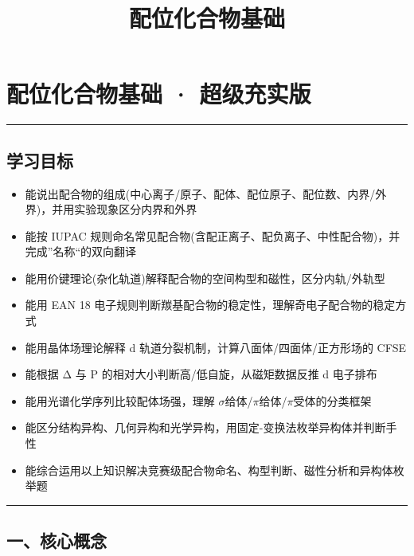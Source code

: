 \documentclass[a4paper,11pt]{ctexart}
\title{配位化合物基础}
\date{}
\providecommand{\tightlist}{\setlength{\itemsep}{0pt}\setlength{\parskip}{0pt}}
\newcommand{\箭}{\ensuremath{\rightarrow}}
\newcommand{\左箭}{\ensuremath{\leftarrow}}
\newcommand{\上箭}{\ensuremath{\uparrow}}
\newcommand{\下箭}{\ensuremath{\downarrow}}
\newcommand{\衡}{\ensuremath{\rightleftharpoons}}
\newcommand{\双箭}{\ensuremath{\leftrightarrow}}
\newcommand{\约等于}{\ensuremath{\approx}}
\newcommand{\小于等于}{\ensuremath{\leq}}
\newcommand{\大于等于}{\ensuremath{\geq}}
\newcommand{\不等于}{\ensuremath{\neq}}
\newcommand{\西格马}{\ensuremath{\sigma}}
\newcommand{\派}{\ensuremath{\pi}}
\begin{document}
\maketitle
\tableofcontents
\newpage
\section{配位化合物基础 · 超级充实版}\label{ux914dux4f4dux5316ux5408ux7269ux57faux7840-ux8d85ux7ea7ux5145ux5b9eux7248}

\begin{center}\rule{0.5\linewidth}{0.5pt}\end{center}

\subsection{学习目标}\label{ux5b66ux4e60ux76eeux6807}

\begin{itemize}
\tightlist
\item
  能说出配合物的组成(中心离子/原子、配体、配位原子、配位数、内界/外界)，并用实验现象区分内界和外界
\item
  能按 IUPAC 规则命名常见配合物(含配正离子、配负离子、中性配合物)，并完成''名称``的双向翻译
\item
  能用价键理论(杂化轨道)解释配合物的空间构型和磁性，区分内轨/外轨型
\item
  能用 EAN 18 电子规则判断羰基配合物的稳定性，理解奇电子配合物的稳定方式
\item
  能用晶体场理论解释 d 轨道分裂机制，计算八面体/四面体/正方形场的 CFSE
\item
  能根据 Δ 与 P 的相对大小判断高/低自旋，从磁矩数据反推 d 电子排布
\item
  能用光谱化学序列比较配体场强，理解 \西格马 给体/\派 给体/\派 受体的分类框架
\item
  能区分结构异构、几何异构和光学异构，用固定-变换法枚举异构体并判断手性
\item
  能综合运用以上知识解决竞赛级配合物命名、构型判断、磁性分析和异构体枚举题
\end{itemize}

\begin{center}\rule{0.5\linewidth}{0.5pt}\end{center}

\subsection{一、核心概念}\label{ux4e00ux6838ux5fc3ux6982ux5ff5}
\end{document}
